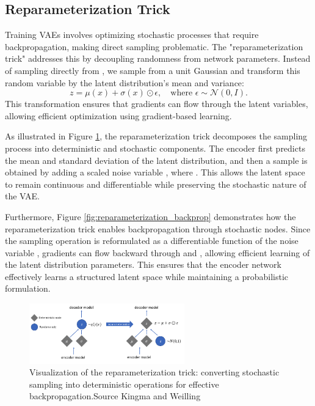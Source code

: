 \subsection{Reparameterization Trick} \label{subsec:reparameterization_trick}
Training VAEs involves optimizing stochastic processes that require backpropagation, making direct sampling problematic. The "reparameterization trick" addresses this by decoupling randomness from network parameters. Instead of sampling directly from , we sample from a unit Gaussian and transform this random variable by the latent distribution's mean and variance:
\begin{equation}
z = \mu(x) + \sigma(x) \odot \epsilon, \quad \text{where } \epsilon \sim \mathcal{N}(0, I).
\end{equation}
This transformation ensures that gradients can flow through the latent variables, allowing efficient optimization using gradient-based learning.

As illustrated in Figure \ref{fig:reparameterization_trick}, the reparameterization trick decomposes the sampling process into deterministic and stochastic components. The encoder first predicts the mean  and standard deviation  of the latent distribution, and then a sample  is obtained by adding a scaled noise variable , where . This allows the latent space to remain continuous and differentiable while preserving the stochastic nature of the VAE.

Furthermore, Figure \ref{fig:reparameterization_backprop} demonstrates how the reparameterization trick enables backpropagation through stochastic nodes. Since the sampling operation is reformulated as a differentiable function of the noise variable , gradients can flow backward through  and , allowing efficient learning of the latent distribution parameters. This ensures that the encoder network effectively learns a structured latent space while maintaining a probabilistic formulation.

\begin{figure}[htbp]
    \centering
    \includegraphics[width=0.6\textwidth]{img/vae/reparameterization_trick.png}
    \caption{Visualization of the reparameterization trick: converting stochastic sampling into deterministic operations for effective backpropagation.Source Kingma and Weilling~\cite{Kingma_2019}}
    \label{fig:reparameterization_trick}
\end{figure}

